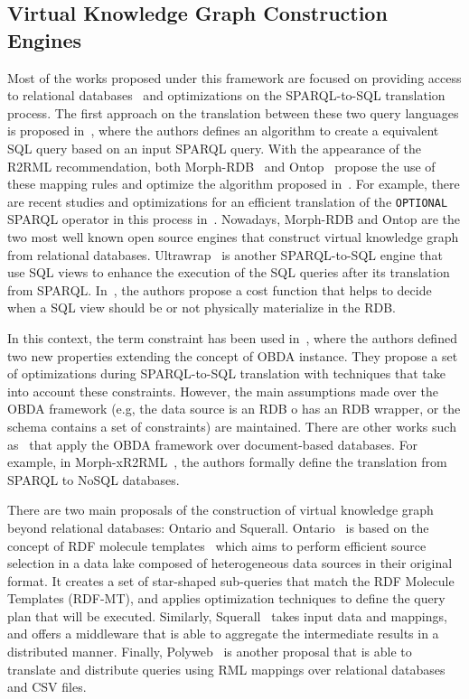 \subsection{Virtual Knowledge Graph Construction Engines}
Most of the works proposed under this framework are focused on providing access to relational databases~\citep{priyatna2014formalisation,calvanese2017ontop,sequeda2013ultrawrap} and optimizations on the  SPARQL-to-SQL translation process. The first approach on the translation between these two query languages is proposed in~\citep{chebotko2009semantics}, where the authors defines an algorithm to create a equivalent SQL query based on an input SPARQL query. With the appearance of the R2RML recommendation, both Morph-RDB~\citep{priyatna2014formalisation} and Ontop~\citep{calvanese2017ontop} propose the use of these mapping rules and optimize the algorithm proposed in~\citep{chebotko2009semantics}. For example, there are recent studies and optimizations for an efficient translation of the \texttt{OPTIONAL} SPARQL operator in this process in~\citep{xiao2018efficient}. Nowadays, Morph-RDB and Ontop are the two most well known open source engines that construct virtual knowledge graph from relational databases. Ultrawrap~\citep{sequeda2013ultrawrap,sequeda2014obda} is another SPARQL-to-SQL engine that use SQL views to enhance the execution of the SQL queries after its translation from SPARQL. In~\citep{sequeda2014obda}, the authors propose a cost function that helps to decide when a SQL view should be or not physically materialize in the RDB.

In this context, the term constraint has been used in~\citep{hovland2016obda}, where the authors defined two new properties extending the concept of OBDA instance. They propose a set of optimizations  during  SPARQL-to-SQL translation with techniques that take into account these constraints. However, the main assumptions made over the OBDA framework (e.g, the data source is an RDB o has an RDB wrapper, or the schema contains a set of constraints) are maintained. There are other works such as~\citep{michel2015translation,botoeva2019ontology} that apply the OBDA framework over document-based databases. For example, in Morph-xR2RML~\citep{michel2015translation}, the authors formally define the translation from SPARQL to NoSQL databases.

There are two main proposals of the construction of virtual knowledge graph beyond relational databases: Ontario and Squerall. Ontario~\citep{endris2019ontario} is based on the concept of RDF molecule templates~\citep{endris2017mulder} which aims to perform efficient source selection in a data lake composed of heterogeneous data sources in their original format. It creates a set of star-shaped sub-queries that match the RDF Molecule Templates (RDF-MT), and applies optimization techniques to define the query plan that will be executed. Similarly, Squerall~\citep{mami2019querying} takes input data and mappings, and offers a middleware that is able to aggregate the intermediate results in a distributed manner. Finally, Polyweb~\citep{khan2019one} is another proposal that is able to translate and distribute queries using RML mappings over relational databases and CSV files.



